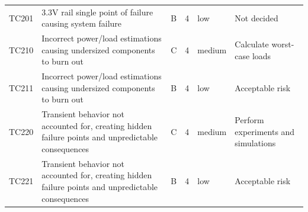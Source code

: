 \begin{longtable}{L{1.5cm}L{3cm}L{1cm}L{1cm}L{2cm}L{6cm}}
 TC201 & 3.3V rail single point of failure causing system failure & B & 4 & low & Not decided \\
 TC210 & Incorrect power/load estimations causing undersized components to burn out & C & 4 & medium & Calculate worst-case loads \\
 TC211 & Incorrect power/load estimations causing undersized components to burn out & B & 4 & low & Acceptable risk \\
 TC220 & Transient behavior not accounted for, creating hidden failure points and unpredictable consequences & C & 4 & medium & Perform experiments and simulations \\
 TC221 & Transient behavior not accounted for, creating hidden failure points and unpredictable consequences & B & 4 & low & Acceptable risk \\
\end{longtable}
